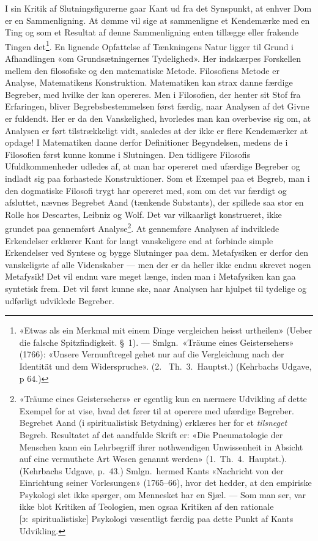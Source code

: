\documentclass[12pt,a4paper]{article}
\newcommand{\apage}[1]{\marginnote{\footnotesize\textit{[#1]}}}
\begin{document}
I sin Kritik af Slutningsfigurerne gaar Kant ud fra det Synspunkt, at
enhver Dom \apage{19} er en Sammenligning. At dømme vil sige at sammenligne et
Kendemærke med en Ting og som et Resultat af denne Sammenligning enten
tillægge eller frakende Tingen
det\footnote{«Etwas als ein Merkmal mit einem Dinge vergleichen heisst
urtheilen» (Ueber die falsche Spitzfindigkeit. §\ 1). ---
Smlgn.\ «Träume eines Geistersehers» (1766): «Unsere Vernunftregel gehet
nur auf die Vergleichung nach der Identität und dem Widerspruche». (2.\
Th.\ 3.\ Hauptst.) (Kehrbachs Udgave, p 64.)}. En lignende Opfattelse
af Tænkningens Natur ligger til Grund i Afhandlingen «om Grundsætningernes
Tydelighed». Her indskærpes Forskellen mellem den filosofiske og den
matematiske Metode. Filosofiens Metode er Analyse, Matematikens
Konstruktion. Matematiken kan strax danne færdige Begreber, med hvilke
der kan opereres. Men i Filosofien, der henter sit Stof fra Erfaringen,
bliver Begrebsbestemmelsen først færdig, naar Analysen af det Givne er
fuldendt. Her er da den Vanskelighed, hvorledes man kan overbevise sig
om, at Analysen er ført tilstrækkeligt vidt, saaledes at der ikke er
flere Kendemærker at opdage! I Matematiken danne derfor Definitioner
Begyndelsen, medens de i Filosofien først kunne komme i Slutningen. Den
tidligere Filosofis Ufuldkommenheder udledes af, at man har opereret med
ufærdige Begreber og indladt sig paa forhastede Konstruktioner. Som et
Exempel paa et Begreb, man i den dogmatiske Filosofi trygt har opereret
med, som om det var færdigt og afsluttet, nævnes Begrebet Aand (tænkende
Substants), der spillede saa stor en Rolle hos Descartes, Leibniz og
Wolf. Det var vilkaarligt konstrueret, ikke grundet paa gennemført
Analyse\footnote{«Träume eines Geistersehers» er egentlig kun en nærmere
Udvikling af dette Exempel for at vise, hvad det fører til at operere med
ufærdige Begreber. Begrebet Aand (i spiritualistisk Betydning) erklæres
her for et \emph{tilsneget} Begreb. Resultatet af det aandfulde Skrift er: «Die
Pneumatologie der Menschen kann ein Lehrbegriff ihrer nothwendigen
Unwissenheit in Absicht auf eine vermuthete Art Wesen genannt werden»
(1.\ Th.\ 4.\ Hauptst.). (Kehrbachs Udgave, p.\ 43.) Smlgn.\ hermed Kants
«Nachricht von der Einrichtung seiner Vorlesungen» (1765--66), hvor det
hedder, at den empiriske Psykologi slet ikke spørger, om Mennesket har en
Sjæl. --- Som man ser, var ikke blot Kritiken af Teologien, men ogsaa
Kritiken af den rationale [ɔ:\ spiritualistiske] Psykologi væsentligt
færdig paa dette Punkt af Kants Udvikling.}. At gennemføre Analysen af
indviklede Erkendelser erklærer Kant for langt vanskeligere end at
forbinde simple Erkendelser ved Syntese og bygge Slutninger paa dem.
Metafysiken er derfor den vanskeligste af alle Videnskaber --- men der er
da heller ikke endnu skrevet nogen Metafysik! Det vil endnu vare meget
længe, inden man i Metafysiken kan gaa syntetisk frem. Det vil først
kunne ske, naar Analysen har hjulpet til tydelige og udførligt udviklede
Begreber.
\end{document}
